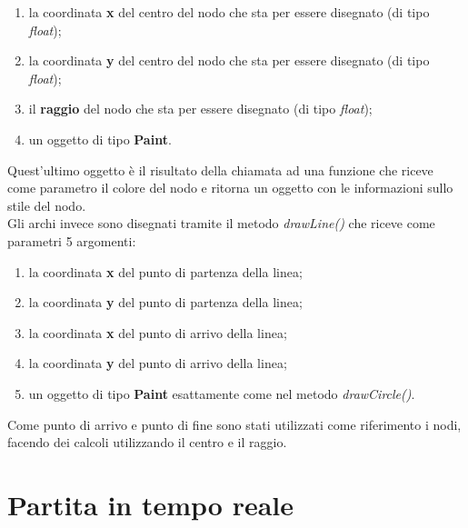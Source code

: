\documentclass[a4paper,11pt,twoside,openright]{report}
\begin{document}
\begin{enumerate}
\item la coordinata \textbf{x} del centro del nodo che sta per essere disegnato (di tipo \textit{float});

\item la coordinata \textbf{y} del centro del nodo che sta per essere disegnato (di tipo \textit{float});

\item il \textbf{raggio} del nodo che sta per essere disegnato (di tipo \textit{float});

\item un oggetto di tipo \textbf{Paint}.
\end{enumerate}

Quest'ultimo oggetto è il risultato della chiamata ad una funzione che riceve come parametro il colore del nodo e ritorna un oggetto con le informazioni sullo stile del nodo.\\ 
Gli archi invece sono disegnati tramite il metodo \textit{drawLine()} che riceve come parametri 5 argomenti:

\begin{enumerate}
\item la coordinata \textbf{x} del punto di partenza della linea;

\item la coordinata \textbf{y} del punto di partenza della linea;

\item la coordinata \textbf{x} del punto di arrivo della linea;

\item la coordinata \textbf{y} del punto di arrivo della linea;

\item un oggetto di tipo \textbf{Paint} esattamente come nel metodo \textit{drawCircle()}.
\end{enumerate}

Come punto di arrivo e punto di fine sono stati utilizzati come riferimento i nodi, facendo dei calcoli utilizzando il centro e il raggio.

\chapter{Partita in tempo reale}
\end{document}
